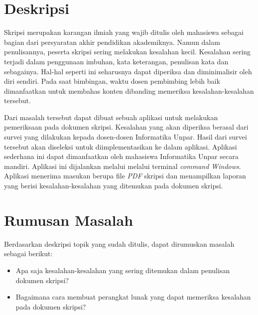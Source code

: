 \documentclass[a4paper,twoside]{article}
\begin{document}
\title{\@judultopik}
\author{\nama \textendash \@npm} 

\newcommand{\nama}{Marcell Trixie Alexander}
\newcommand{\@npm}{2014730003}
\newcommand{\@judultopik}{Aplikasi Pemeriksa Kesalahan Umum Dokumen Skripsi Teknik Informatika UNPAR} %
\newcommand{\jumpemb}{1} %
\newcommand{\tanggal}{20/08/2019}


\maketitle


\section{Deskripsi}
Skripsi merupakan karangan ilmiah yang wajib ditulis oleh mahasiswa sebagai bagian dari persyaratan akhir pendidikan akademiknya. Namun dalam penulisannya, peserta skripsi sering melakukan kesalahan kecil. Kesalahan sering terjadi dalam penggunaan imbuhan, kata keterangan, penulisan kata dan sebagainya. Hal-hal seperti ini seharusnya dapat diperiksa dan diminimalisir oleh diri sendiri. Pada saat bimbingan, waktu dosen pembimbing lebih baik dimanfaatkan untuk membahas konten dibanding memeriksa kesalahan-kesalahan tersebut.

Dari masalah tersebut dapat dibuat sebuah aplikasi untuk melakukan pemeriksaan pada dokumen skripsi. Kesalahan yang akan diperiksa berasal dari survei yang dilakukan kepada dosen-dosen Informatika Unpar. Hasil dari survei tersebut akan diseleksi untuk diimplementasikan ke dalam aplikasi. Aplikasi sederhana ini dapat dimanfaatkan oleh mahasiswa Informatika Unpar secara mandiri. Aplikasi ini dijalankan melalui melalui terminal \textit{command Windows}. Aplikasi menerima masukan berupa file \textit{PDF} skripsi dan menampilkan laporan yang berisi kesalahan-kesalahan yang ditemukan pada dokumen skripsi. 

\section{Rumusan Masalah}
Berdasarkan deskripsi topik yang sudah ditulis, dapat dirumuskan masalah sebagai berikut:
\begin{itemize}
	\item Apa saja kesalahan-kesalahan yang sering ditemukan dalam penulisan dokumen skripsi?
	\item Bagaimana cara membuat perangkat lunak yang dapat memeriksa kesalahan pada dokumen skripsi?
\end{itemize}
\end{document}
